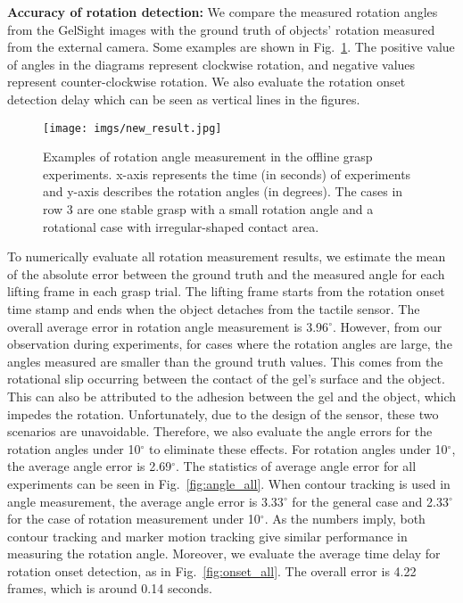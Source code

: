 \textbf{Accuracy of rotation detection: }
We compare the measured rotation angles from the GelSight images with the ground truth of objects' rotation measured from the external camera. Some examples are shown in Fig.~\ref{fig:result}. The positive value of angles in the diagrams represent clockwise rotation, and negative values represent counter-clockwise rotation. We also evaluate the rotation onset detection delay which can be seen as vertical lines in the figures. 
\begin{figure}[t]
    \centering
    \texttt{[image: imgs/new\_result.jpg]}
    \caption{
    Examples of rotation angle measurement in the offline grasp experiments. x-axis represents the time (in seconds) of experiments and y-axis describes the rotation angles (in degrees). 
    The cases in row 3 are one stable grasp with a small rotation angle and a rotational case with irregular-shaped contact area. 
    }
    \vspace{-4mm}
    \label{fig:result}
\end{figure}

To numerically evaluate all rotation measurement results, we estimate the mean of the absolute error between the ground truth and the measured angle for each lifting frame in each grasp trial. The lifting frame starts from the rotation onset time stamp and ends when the object detaches from the tactile sensor. The overall average error in rotation angle measurement is 3.96$^{\circ}$. However, from our observation during experiments, for cases where the rotation angles are large, the angles measured are smaller than the ground truth values. This comes from the rotational slip occurring between the contact of the gel's surface and the object. This can also be attributed to the adhesion between the gel and the object, which impedes the rotation. Unfortunately, due to the design of the sensor, these two scenarios are unavoidable. Therefore, we also evaluate the angle errors for the rotation angles under 10$^{\circ}$ to eliminate these effects. For rotation angles under 10$^{\circ}$, the average angle error is 2.69$^{\circ}$. The statistics of average angle error for all experiments can be seen in Fig.~\ref{fig:angle_all}. When contour tracking is used in angle measurement, the average angle error is 3.33$^{\circ}$ for the general case and 2.33$^{\circ}$ for the case of rotation measurement under 10$^{\circ}$. As the numbers imply, both contour tracking and marker motion tracking give similar performance in measuring the rotation angle.  Moreover, we evaluate the average time delay for rotation onset detection, as in Fig.~\ref{fig:onset_all}. The overall error is 4.22 frames, which is around 0.14 seconds. 


